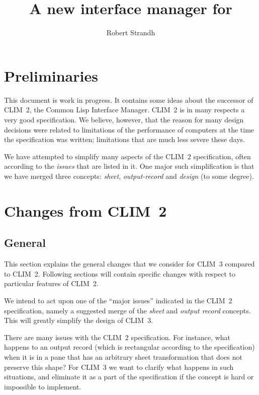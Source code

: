 \documentclass{report}
\title{\clim{}\\ A new interface manager for\\ \cl{}}
\author{Robert Strandh}
\def\clim{CLIM~3}
\def\climtwo{CLIM~2}
\begin{document}
\maketitle

\chapter{Preliminaries}

This document is work in progress.  It contains some ideas about the
successor of \climtwo{}, the Common Lisp Interface Manager.  \climtwo{} is in
many respects a very good specification.  We believe, however, that
the reason for many design decisions were related to limitations of
the performance of computers at the time the specification was
written; limitations that are much less severe these days.  

We have attempted to simplify many aspects of the \climtwo{}
specification, often according to the \emph{issues} that are listed in
it.  One major such simplification is that we have merged three
concepts: \emph{sheet}, \emph{output-record} and \emph{design} (to
some degree). 

\chapter{Changes from \climtwo{}}

\section{General}

This section explains the general changes that we consider for \clim{}
compared to \climtwo{}.  Following sections will contain specific changes
with respect to particular features of \climtwo{}.

We intend to act upon one of the ``major issues'' indicated in the
\climtwo{} specification, namely a suggested merge of the \emph{sheet} and
\emph{output record} concepts.  This will greatly simplify the design
of \clim{}.

There are many issues with the \climtwo{} specification.  For
instance, what happens to an output record (which is rectangular
according to the specification) when it is in a pane that has an
arbitrary sheet transformation that does not preserve this shape?  For
\clim{} we want to clarify what happens in such situations, and
eliminate it as a part of the specification if the concept is hard or
impossible to implement. 
\end{document}
